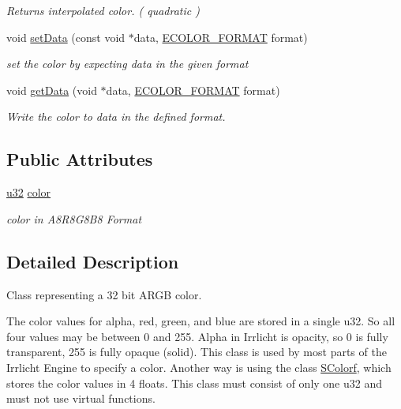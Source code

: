 \begin{DoxyCompactItemize}
\begin{DoxyCompactList}\small\item\em Returns interpolated color. ( quadratic ) \end{DoxyCompactList}\item 
void \hyperlink{classirr_1_1video_1_1SColor_a381f2db0ed17c6b06ba5c8809dce3370}{set\+Data} (const void $\ast$data, \hyperlink{namespaceirr_1_1video_a1d5e487888c32b1674a8f75116d829ed}{E\+C\+O\+L\+O\+R\+\_\+\+F\+O\+R\+M\+AT} format)
\begin{DoxyCompactList}\small\item\em set the color by expecting data in the given format \end{DoxyCompactList}\item 
void \hyperlink{classirr_1_1video_1_1SColor_a7cba1b914230289de9c91ff28be96bc9}{get\+Data} (void $\ast$data, \hyperlink{namespaceirr_1_1video_a1d5e487888c32b1674a8f75116d829ed}{E\+C\+O\+L\+O\+R\+\_\+\+F\+O\+R\+M\+AT} format)
\begin{DoxyCompactList}\small\item\em Write the color to data in the defined format. \end{DoxyCompactList}\end{DoxyCompactItemize}
\subsection*{Public Attributes}
\begin{DoxyCompactItemize}
\item 
\hyperlink{namespaceirr_a0416a53257075833e7002efd0a18e804}{u32} \hyperlink{classirr_1_1video_1_1SColor_a11f2b41eeff9e7f688d322735ca2cfcf}{color}\hypertarget{classirr_1_1video_1_1SColor_a11f2b41eeff9e7f688d322735ca2cfcf}{}\label{classirr_1_1video_1_1SColor_a11f2b41eeff9e7f688d322735ca2cfcf}

\begin{DoxyCompactList}\small\item\em color in A8\+R8\+G8\+B8 Format \end{DoxyCompactList}\end{DoxyCompactItemize}


\subsection{Detailed Description}
Class representing a 32 bit A\+R\+GB color. 

The color values for alpha, red, green, and blue are stored in a single u32. So all four values may be between 0 and 255. Alpha in Irrlicht is opacity, so 0 is fully transparent, 255 is fully opaque (solid). This class is used by most parts of the Irrlicht Engine to specify a color. Another way is using the class \hyperlink{classirr_1_1video_1_1SColorf}{S\+Colorf}, which stores the color values in 4 floats. This class must consist of only one u32 and must not use virtual functions. 


